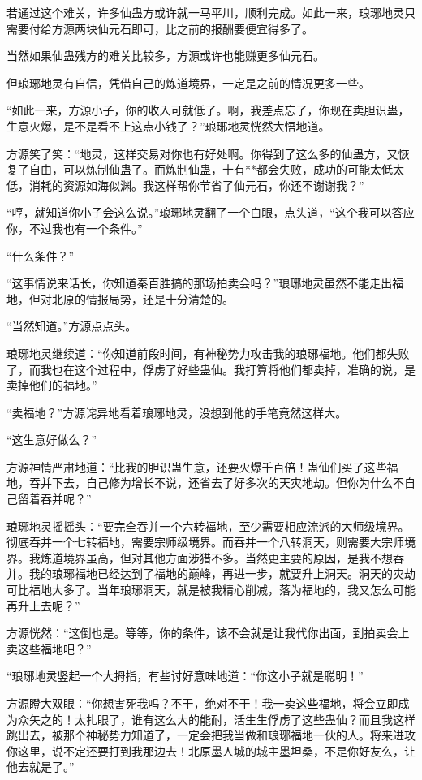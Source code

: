 \begin{this_body}
若通过这个难关，许多仙蛊方或许就一马平川，顺利完成。如此一来，琅琊地灵只需要付给方源两块仙元石即可，比之前的报酬要便宜得多了。

当然如果仙蛊残方的难关比较多，方源或许也能赚更多仙元石。

但琅琊地灵有自信，凭借自己的炼道境界，一定是之前的情况更多一些。

“如此一来，方源小子，你的收入可就低了。啊，我差点忘了，你现在卖胆识蛊，生意火爆，是不是看不上这点小钱了？”琅琊地灵恍然大悟地道。

方源笑了笑：“地灵，这样交易对你也有好处啊。你得到了这么多的仙蛊方，又恢复了自由，可以炼制仙蛊了。而炼制仙蛊，十有**都会失败，成功的可能太低太低，消耗的资源如海似渊。我这样帮你节省了仙元石，你还不谢谢我？”

“哼，就知道你小子会这么说。”琅琊地灵翻了一个白眼，点头道，“这个我可以答应你，不过我也有一个条件。”

“什么条件？”

“这事情说来话长，你知道秦百胜搞的那场拍卖会吗？”琅琊地灵虽然不能走出福地，但对北原的情报局势，还是十分清楚的。

“当然知道。”方源点点头。

琅琊地灵继续道：“你知道前段时间，有神秘势力攻击我的琅琊福地。他们都失败了，而我也在这个过程中，俘虏了好些蛊仙。我打算将他们都卖掉，准确的说，是卖掉他们的福地。”

“卖福地？”方源诧异地看着琅琊地灵，没想到他的手笔竟然这样大。

“这生意好做么？”

方源神情严肃地道：“比我的胆识蛊生意，还要火爆千百倍！蛊仙们买了这些福地，吞并下去，自己修为增长不说，还省去了好多次的天灾地劫。但你为什么不自己留着吞并呢？”

琅琊地灵摇摇头：“要完全吞并一个六转福地，至少需要相应流派的大师级境界。彻底吞并一个七转福地，需要宗师级境界。而吞并一个八转洞天，则需要大宗师境界。我炼道境界虽高，但对其他方面涉猎不多。当然更主要的原因，是我不想吞并。我的琅琊福地已经达到了福地的巅峰，再进一步，就要升上洞天。洞天的灾劫可比福地大多了。当年琅琊洞天，就是被我精心削减，落为福地的，我又怎么可能再升上去呢？”

方源恍然：“这倒也是。等等，你的条件，该不会就是让我代你出面，到拍卖会上卖这些福地吧？”

“琅琊地灵竖起一个大拇指，有些讨好意味地道：“你这小子就是聪明！”

方源瞪大双眼：“你想害死我吗？不干，绝对不干！我一卖这些福地，将会立即成为众矢之的！太扎眼了，谁有这么大的能耐，活生生俘虏了这些蛊仙？而且我这样跳出去，被那个神秘势力知道了，一定会把我当做和琅琊福地一伙的人。将来进攻你这里，说不定还要打到我那边去！北原墨人城的城主墨坦桑，不是你好友么，让他去就是了。”


\end{this_body}
